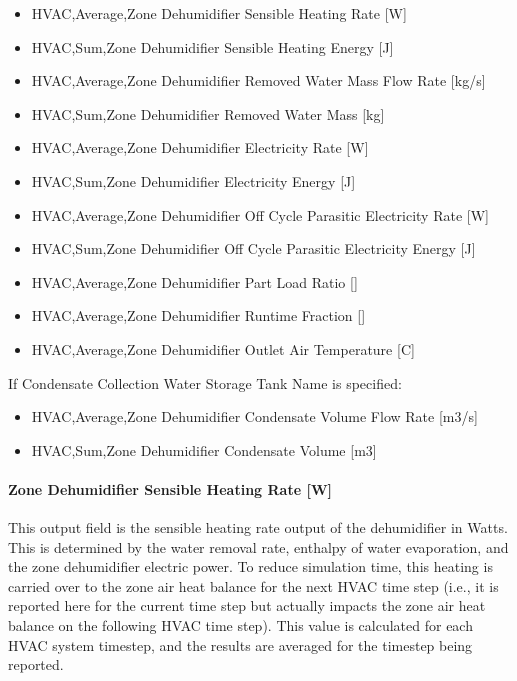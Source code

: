 \begin{itemize}
\item
  HVAC,Average,Zone Dehumidifier Sensible Heating Rate {[}W{]}
\item
  HVAC,Sum,Zone Dehumidifier Sensible Heating Energy {[}J{]}
\item
  HVAC,Average,Zone Dehumidifier Removed Water Mass Flow Rate {[}kg/s{]}
\item
  HVAC,Sum,Zone Dehumidifier Removed Water Mass {[}kg{]}
\item
  HVAC,Average,Zone Dehumidifier Electricity Rate {[}W{]}
\item
  HVAC,Sum,Zone Dehumidifier Electricity Energy {[}J{]}
\item
  HVAC,Average,Zone Dehumidifier Off Cycle Parasitic Electricity Rate {[}W{]}
\item
  HVAC,Sum,Zone Dehumidifier Off Cycle Parasitic Electricity Energy {[}J{]}
\item
  HVAC,Average,Zone Dehumidifier Part Load Ratio {[]}
\item
  HVAC,Average,Zone Dehumidifier Runtime Fraction {[]}
\item
  HVAC,Average,Zone Dehumidifier Outlet Air Temperature {[}C{]}
\end{itemize}

If Condensate Collection Water Storage Tank Name is specified:

\begin{itemize}
\item
  HVAC,Average,Zone Dehumidifier Condensate Volume Flow Rate {[}m3/s{]}
\item
  HVAC,Sum,Zone Dehumidifier Condensate Volume {[}m3{]}
\end{itemize}

\paragraph{Zone Dehumidifier Sensible Heating Rate {[}W{]}}\label{zone-dehumidifier-sensible-heating-rate-w}

This output field is the sensible heating rate output of the dehumidifier in Watts. This is determined by the water removal rate, enthalpy of water evaporation, and the zone dehumidifier electric power. To reduce simulation time, this heating is carried over to the zone air heat balance for the next HVAC time step (i.e., it is reported here for the current time step but actually impacts the zone air heat balance on the following HVAC time step). This value is calculated for each HVAC system timestep, and the results are averaged for the timestep being reported.

